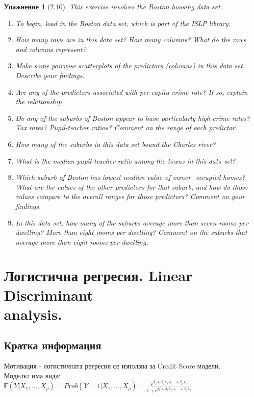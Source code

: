 \documentclass{article}
\newtheorem{exercise}[subsubsection]{Упажнение}
\begin{document}
	\begin{exercise}[2.10]
		This exercise involves the Boston housing data set.
		\begin{enumerate}[label=(\alph*)]
		\item To begin, load in the Boston data set, which is part of the ISLP
		library.
		\item How many rows are in this data set? How many columns? What
		do the rows and columns represent?
		\item Make some pairwise scatterplots of the predictors (columns) in
		this data set. Describe your findings.
		\item Are any of the predictors associated with per capita crime rate?
		If so, explain the relationship. 
		\item Do any of the suburbs of Boston appear to have particularly
		high crime rates? Tax rates? Pupil-teacher ratios? Comment on
		the range of each predictor.		 
		\item How many of the suburbs in this data set bound the Charles
		river?		 
		\item What is the median pupil-teacher ratio among the towns in this
		data set?		 
		\item Which suburb of Boston has lowest median value of owner-
		occupied homes? What are the values of the other predictors
		for that suburb, and how do those values compare to the overall
		ranges for those predictors? Comment on your findings.	 	 
		\item In this data set, how many of the suburbs average more than
		seven rooms per dwelling? More than eight rooms per dwelling?
		Comment on the suburbs that average more than eight rooms
		per dwelling.
		\end{enumerate}
	\end{exercise}
	
		
		
		
\newpage	
\section{Логистична регресия. Linear Discriminant \\ analysis.}




	\subsection{Кратка информация}
	Мотивация - логистичната регресия се използва за Credit Score модели.\\
	Моделът има вида: \\
	$\mathbb{E}(Y|X_1, \dots, X_p) = Prob(Y=1|X_1, \dots, X_p) = \frac{e^{\beta_0 + \beta_1 X_1 + \dots + \beta_p X_p}}{1+ e^{\beta_0 + \beta_1 X_1 + \dots + \beta_p X_p}} $
	
\end{document}
